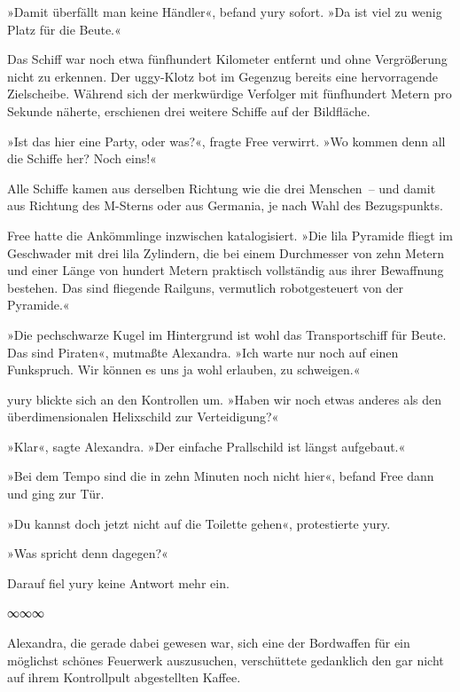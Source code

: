 »Damit überfällt man keine Händler«, befand yury sofort. »Da ist viel zu wenig Platz für die Beute.«

Das Schiff war noch etwa fünfhundert Kilometer entfernt und ohne Vergrößerung nicht zu erkennen. Der uggy-Klotz bot im Gegenzug bereits eine hervorragende Zielscheibe. Während sich der merkwürdige Verfolger mit fünfhundert Metern pro Sekunde näherte, erschienen drei weitere Schiffe auf der Bildfläche.

»Ist das hier eine Party, oder was?«, fragte Free verwirrt. »Wo kommen denn all die Schiffe her? Noch eins!«

Alle Schiffe kamen aus derselben Richtung wie die drei Menschen~– und damit aus Richtung des M-Sterns oder aus Germania, je nach Wahl des Bezugspunkts.

Free hatte die Ankömmlinge inzwischen katalogisiert. »Die lila Pyramide fliegt im Geschwader mit drei lila Zylindern, die bei einem Durchmesser von zehn Metern und einer Länge von hundert Metern praktisch vollständig aus ihrer Bewaffnung bestehen. Das sind fliegende Railguns, vermutlich robotgesteuert von der Pyramide.«

»Die pechschwarze Kugel im Hintergrund ist wohl das Transportschiff für Beute. Das sind Piraten«, mutmaßte Alexandra. »Ich warte nur noch auf einen Funkspruch. Wir können es uns ja wohl erlauben, zu schweigen.«

yury blickte sich an den Kontrollen um. »Haben wir noch etwas anderes als den überdimensionalen Helixschild zur Verteidigung?«

»Klar«, sagte Alexandra. »Der einfache Prallschild ist längst aufgebaut.«

»Bei dem Tempo sind die in zehn Minuten noch nicht hier«, befand Free dann und ging zur Tür.

»Du kannst doch jetzt nicht auf die Toilette gehen«, protestierte yury.

»Was spricht denn dagegen?«

Darauf fiel yury keine Antwort mehr ein.

\begin{center}
∞∞∞
\end{center}


Alexandra, die gerade dabei gewesen war, sich eine der Bordwaffen für ein möglichst schönes Feuerwerk auszusuchen, verschüttete gedanklich den gar nicht auf ihrem Kontrollpult abgestellten Kaffee.

